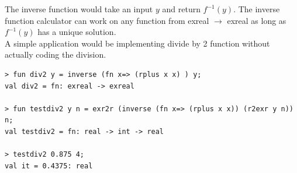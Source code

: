 \documentclass[12pt,twoside,notitlepage]{report}
\begin{document}
The inverse function would take an input $y$ and return $f^{-1}(y)$. The inverse function calculator can work on any function from exreal $\to$ exreal as long as $f^{-1}(y)$ has a unique solution.\\
A simple application would be implementing divide by 2 function without actually coding the division.\\
 
{
\begin{verbatim}
> fun div2 y = inverse (fn x=> (rplus x x) ) y;
val div2 = fn: exreal -> exreal

> fun testdiv2 y n = exr2r (inverse (fn x=> (rplus x x)) (r2exr y n)) n;
val testdiv2 = fn: real -> int -> real

> testdiv2 0.875 4;
val it = 0.4375: real
\end{verbatim}
} 
\end{document}

